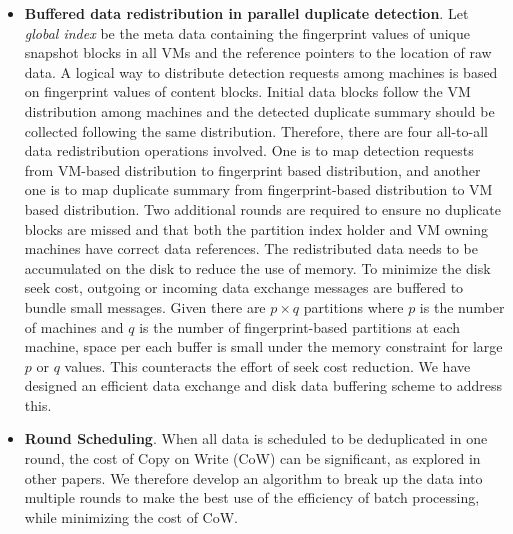 \begin{itemize}
\item {\bf Buffered data redistribution in parallel duplicate detection}.  
Let {\em global index} be the meta data containing the fingerprint values of unique snapshot blocks 
in all VMs and  the reference pointers to the location of raw data.
A logical way to distribute detection requests among machines is based on 
fingerprint values of content blocks.
Initial data  blocks follow the VM distribution 
among machines 
and the detected duplicate summary 
should be collected following the same distribution.
Therefore, there are four all-to-all data redistribution operations involved.
One is to map detection requests from VM-based distribution to fingerprint based distribution, and
another one  is to map duplicate summary from fingerprint-based distribution to VM based distribution.
Two additional rounds are required to ensure no duplicate blocks are missed
and that both the partition index holder and VM owning machines have correct
data references.
The redistributed data needs to be accumulated on the disk to reduce the use of memory.
To minimize the disk seek cost, outgoing or incoming data exchange messages are buffered to 
bundle small messages.
Given there are $p\times q$ partitions where $p$ is the number of machines and $q$ is the number of fingerprint-based partitions
at each machine, space per each buffer  is small under the memory constraint for large $p$ or $q$ values.
This counteracts the effort of seek cost reduction.  
We have designed an efficient data exchange and disk data buffering  scheme to address this.
\item {\bf Round Scheduling}.
When all data is scheduled to be deduplicated in one round, the cost of Copy
on Write (CoW) can be significant, as explored in other papers\cite{EMCIncrementalDataChanges}.
We therefore develop an algorithm to break up the data into multiple rounds to
make the best use of the efficiency of batch processing, while minimizing
the cost of CoW.


\end{itemize}
